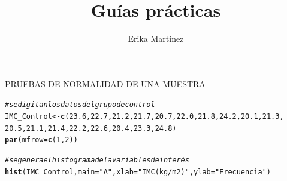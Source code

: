 \documentclass[10pt,a4paper]{article}\usepackage[]{graphicx}\usepackage[]{color}
\author{Erika Martínez}
\title{Guías prácticas}
\makeatletter
\newcommand{\hlnum}[1]{\textcolor[rgb]{0.686,0.059,0.569}{#1}}%
\newcommand{\hlstr}[1]{\textcolor[rgb]{0.192,0.494,0.8}{#1}}%
\newcommand{\hlcom}[1]{\textcolor[rgb]{0.678,0.584,0.686}{\textit{#1}}}%
\newcommand{\hlstd}[1]{\textcolor[rgb]{0.345,0.345,0.345}{#1}}%
\newcommand{\hlkwb}[1]{\textcolor[rgb]{0.69,0.353,0.396}{#1}}%
\newcommand{\hlkwc}[1]{\textcolor[rgb]{0.333,0.667,0.333}{#1}}%
\newcommand{\hlkwd}[1]{\textcolor[rgb]{0.737,0.353,0.396}{\textbf{#1}}}%
\newenvironment{kframe}{%
 \def\at@end@of@kframe{}%
 \ifinner\ifhmode%
  \def\at@end@of@kframe{\end{minipage}}%
  \begin{minipage}{\columnwidth}%
 \fi\fi%
 \def\FrameCommand##1{\hskip\@totalleftmargin \hskip-\fboxsep
 \colorbox{shadecolor}{##1}\hskip-\fboxsep
     \hskip-\linewidth \hskip-\@totalleftmargin \hskip\columnwidth}%
 \MakeFramed {\advance\hsize-\width
   \@totalleftmargin\z@ \linewidth\hsize
   \@setminipage}}%
 {\par\unskip\endMakeFramed%
 \at@end@of@kframe}
\newenvironment{knitrout}{}{} %
\makeatother
\begin{document}
\maketitle
\newpage

PRUEBAS DE NORMALIDAD DE UNA MUESTRA
\begin{knitrout}
\color{fgcolor}\begin{kframe}
\begin{alltt}
\hlcom{#se digitan los datos del grupo de control }
\hlstd{IMC_Control} \hlkwb{<-} \hlkwd{c}\hlstd{(}\hlnum{23.6}\hlstd{,} \hlnum{22.7}\hlstd{,} \hlnum{21.2}\hlstd{,} \hlnum{21.7}\hlstd{,} \hlnum{20.7}\hlstd{,} \hlnum{22.0}\hlstd{,} \hlnum{21.8}\hlstd{,} \hlnum{24.2}\hlstd{,} \hlnum{20.1}\hlstd{,} \hlnum{21.3}\hlstd{,}
                 \hlnum{20.5}\hlstd{,} \hlnum{21.1}\hlstd{,} \hlnum{21.4}\hlstd{,} \hlnum{22.2}\hlstd{,} \hlnum{22.6}\hlstd{,} \hlnum{20.4}\hlstd{,} \hlnum{23.3}\hlstd{,} \hlnum{24.8}\hlstd{)}
\hlkwd{par}\hlstd{(}\hlkwc{mfrow}\hlstd{=}\hlkwd{c}\hlstd{(}\hlnum{1}\hlstd{,}\hlnum{2}\hlstd{))}

\hlcom{# se genera el histograma de la variables de interés}
\hlkwd{hist}\hlstd{(IMC_Control,}\hlkwc{main}\hlstd{=}\hlstr{"A"}\hlstd{,}\hlkwc{xlab}\hlstd{=}\hlstr{"IMC (kg/m2)"}\hlstd{,}\hlkwc{ylab}\hlstd{=}\hlstr{"Frecuencia"}\hlstd{)}


\end{alltt}
\end{kframe}
\end{knitrout}
\end{document}
